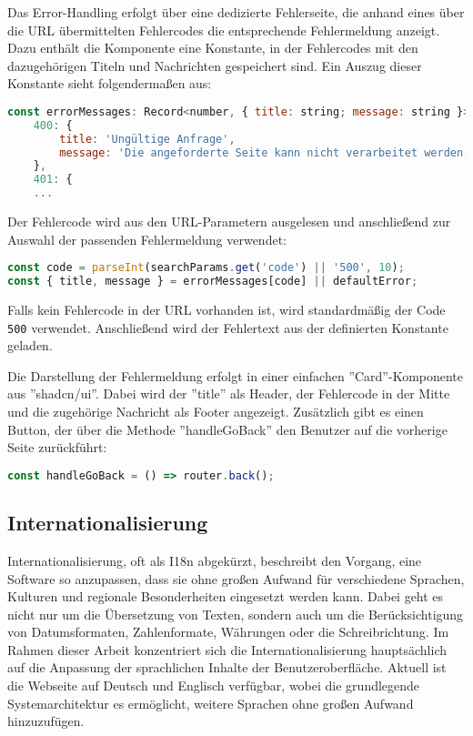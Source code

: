 Das Error-Handling erfolgt über eine dedizierte Fehlerseite, die anhand eines über die URL übermittelten Fehlercodes die entsprechende Fehlermeldung anzeigt. Dazu enthält die Komponente eine Konstante, in der Fehlercodes mit den dazugehörigen Titeln und Nachrichten gespeichert sind. Ein Auszug dieser Konstante sieht folgendermaßen aus:

\begin{lstlisting}[language=JavaScript]
const errorMessages: Record<number, { title: string; message: string }> = {
    400: {
        title: 'Ungültige Anfrage',
        message: 'Die angeforderte Seite kann nicht verarbeitet werden, da erforderliche Daten fehlen.',
    },
    401: {
    ...
		\end{lstlisting}
		
		Der Fehlercode wird aus den URL-Parametern ausgelesen und anschließend zur Auswahl der passenden Fehlermeldung verwendet:
		
\begin{lstlisting}[language=JavaScript]
const code = parseInt(searchParams.get('code') || '500', 10);
const { title, message } = errorMessages[code] || defaultError;
		\end{lstlisting}
		
		Falls kein Fehlercode in der URL vorhanden ist, wird standardmäßig der Code \texttt{500} verwendet. Anschließend wird der Fehlertext aus der definierten Konstante geladen.
		
		Die Darstellung der Fehlermeldung erfolgt in einer einfachen ''Card''-Komponente aus ''shadcn/ui''. Dabei wird der ''title'' als Header, der Fehlercode in der Mitte und die zugehörige Nachricht als Footer angezeigt. Zusätzlich gibt es einen Button, der über die Methode ''handleGoBack'' den Benutzer auf die vorherige Seite zurückführt:
		
\begin{lstlisting}[language=JavaScript]
const handleGoBack = () => router.back();
		\end{lstlisting}
		
\subsection{Internationalisierung}
Internationalisierung, oft als I18n abgekürzt, beschreibt den Vorgang, eine Software so anzupassen, dass sie ohne großen Aufwand für verschiedene Sprachen, Kulturen und regionale Besonderheiten eingesetzt werden kann. Dabei geht es nicht nur um die Übersetzung von Texten, sondern auch um die Berücksichtigung von Datumsformaten, Zahlenformate, Währungen oder die Schreibrichtung.
Im Rahmen dieser Arbeit konzentriert sich die Internationalisierung hauptsächlich auf die Anpassung der sprachlichen Inhalte der Benutzeroberfläche. Aktuell ist die Webseite auf Deutsch und Englisch verfügbar, wobei die grundlegende Systemarchitektur es ermöglicht, weitere Sprachen ohne großen Aufwand hinzuzufügen.

